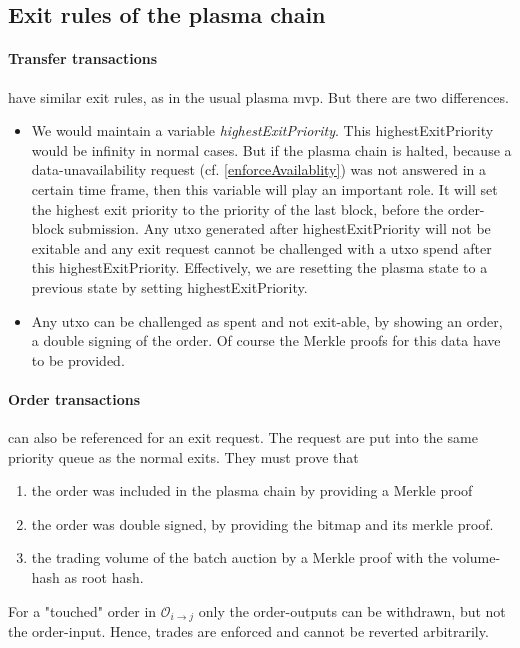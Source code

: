 \documentclass[11pt,parskip=full]{scrartcl}%
\def\pO{\mathcal{O}}
\def\ra{\rightarrow}
\begin{document}
\subsection{Exit rules of the plasma chain}
\label{exitRules}
\paragraph{Transfer transactions} have similar exit rules, as in the usual plasma mvp. 
But there are two differences.
\begin{itemize}

 \item We would maintain a variable \emph{highestExitPriority}. 
This highestExitPriority would be infinity in normal cases. 
But if the plasma chain is halted, because a data-unavailability request (cf. \ref{enforceAvailablity}) was not answered in a certain time frame, then this variable will play an important role. 
It will set the highest exit priority to the priority of the last block, before the order-block submission. 
Any utxo generated after highestExitPriority will not be exitable and any exit request cannot be challenged with a utxo spend after this highestExitPriority. 
Effectively, we are resetting the plasma state to a previous state by setting highestExitPriority. 
\item Any utxo can be challenged as spent and not exit-able, by showing an order, a double signing of the order. Of course the Merkle proofs for this data have to be provided.

\end{itemize}

\paragraph{Order transactions} can also be referenced for an exit request. The request are put into the same priority queue as the normal exits. They must prove that
\begin{enumerate}
\item the order was included in the plasma chain by providing a Merkle proof
\item the order was double signed, by providing the bitmap and its merkle proof.
\item the trading volume of the batch auction by a Merkle proof with the volume-hash as root hash.
\end{enumerate}
For a "touched" order in $\pO_{i\ra j}$ only the order-outputs can be withdrawn, but not the order-input. 
Hence, trades are enforced and cannot be reverted arbitrarily. 
\end{document}
